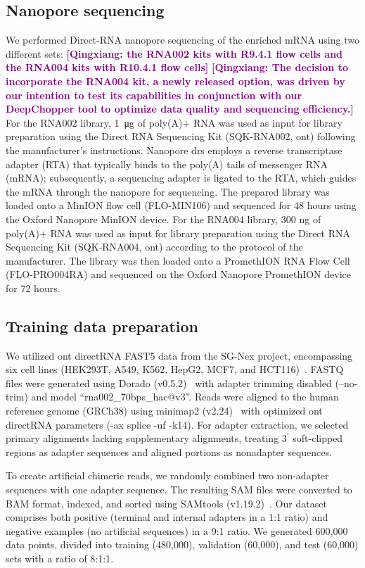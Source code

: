 \documentclass[pdflatex, sn-mathphys-num, lineno]{sn-jnl}%
\newcommand{\qx}[1]{\textcolor{purple}{\textbf{[Qingxiang: #1]}}}
\theoremstyle{thmstyleone}%
\theoremstyle{thmstyletwo}%
\theoremstyle{thmstylethree}%
\begin{document}
\subsection{Nanopore sequencing}

We performed Direct-RNA nanopore sequencing of the enriched mRNA using two different sets: \qx{the RNA002 kits with R9.4.1 flow cells and the RNA004 kits with R10.4.1 flow cells} \qx{The decision to incorporate the RNA004 kit, a newly released option, was driven by our intention to test its capabilities in conjunction with our DeepChopper tool to optimize data quality and sequencing efficiency.}
For the RNA002 library, \SI{1}{\micro\gram} of poly(A)+ RNA was used as input for library preparation using the Direct RNA Sequencing Kit (SQK-RNA002, \gls{ont}) following the manufacturer's instructions.
Nanopore \gls{drs} employs a reverse transcriptase adapter (RTA) that typically binds to the poly(A) tails of messenger RNA (mRNA); subsequently, a sequencing adapter is ligated to the RTA, which guides the mRNA through the nanopore for sequencing.
The prepared library was loaded onto a MinION flow cell (FLO-MIN106) and sequenced for 48 hours using the Oxford Nanopore MinION device.
For the RNA004 library, 300 ng of poly(A)+ RNA was used as input for library preparation using the Direct RNA Sequencing Kit (SQK-RNA004, \gls{ont}) according to the protocol of the manufacturer.
The library was then loaded onto a PromethION RNA Flow Cell (FLO-PRO004RA) and sequenced on the Oxford Nanopore PromethION device for 72 hours.

\subsection{Training data preparation}\label{ssec:data}

We utilized \gls{ont} directRNA FAST5 data from the SG-Nex project, encompassing six cell lines (HEK293T, A549, K562, HepG2, MCF7, and HCT116)~\cite{chen2021systematic}.
FASTQ files were generated using Dorado (v0.5.2)~\cite{dorado2023} with adapter trimming disabled (--no-trim) and  model ``rna002\_70bps\_hac@v3''.
Reads were aligned to the human reference genome (GRCh38) using minimap2 (v2.24)~\cite{li2018minimap2} with optimized \gls{ont} directRNA parameters (-ax splice -uf -k14).
For adapter extraction, we selected primary alignments lacking supplementary alignments, treating \(3^{\prime}\)  soft-clipped regions as adapter sequences and aligned portions as nonadapter sequences.

To create artificial chimeric reads, we randomly combined two non-adapter sequences with one adapter sequence.
The resulting SAM files were converted to BAM format, indexed, and sorted using SAMtools (v1.19.2)~\cite{li2009sequence}.
Our dataset comprises both positive (terminal and internal adapters in a 1:1 ratio) and negative examples (no artificial sequences) in a 9:1 ratio.
We generated 600,000 data points, divided into training (480,000), validation (60,000), and test (60,000) sets with a ratio of 8:1:1.
\end{document}
